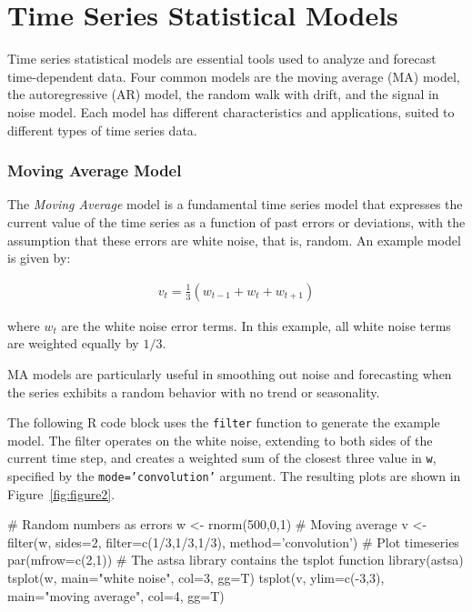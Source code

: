 \section{Time Series Statistical Models}

Time series statistical models are essential tools used to analyze and forecast time-dependent data. Four common models are the moving average (MA) model, the autoregressive (AR) model, the random walk with drift, and the signal in noise model. Each model has different characteristics and applications, suited to different types of time series data.

\subsubsection*{Moving Average Model}

The \emph{Moving Average} model is a fundamental time series model that expresses the current value of the time series as a function of past errors or deviations, with the assumption that these errors are white noise, that is, random. An example model is given by: 

\begin{align*}v_t = \frac{1}{3} ( w_{t-1} + w_t + w_{t+1})
\end{align*}

\noindent where $w_t$ are the white noise error terms. In this example, all white noise terms are weighted equally by $1/3$.

MA models are particularly useful in smoothing out noise and forecasting when the series exhibits a random behavior with no trend or seasonality.

The following R code block uses the \texttt{filter} function to generate the example model. The filter operates on the white noise, extending to both sides of the current time step, and creates a weighted sum of the closest three value in \texttt{w}, specified by the \texttt{mode='convolution'} argument. The resulting plots are shown in Figure~\ref{fig:figure2}. 

\begin{samepage}
\begin{Rcode}
# Random numbers as errors
w <- rnorm(500,0,1)
# Moving average
v <- filter(w, sides=2, filter=c(1/3,1/3,1/3), method='convolution')
# Plot timeseries
par(mfrow=c(2,1))
# The astsa library contains the tsplot function
library(astsa)
tsplot(w, main="white noise", col=3, gg=T)
tsplot(v, ylim=c(-3,3), main="moving average", col=4, gg=T)
\end{Rcode}
\end{samepage}

